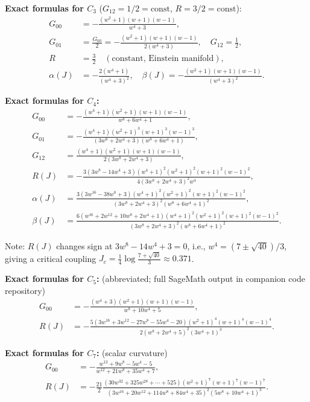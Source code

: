 \documentclass[11pt]{article}
\theoremstyle{definition}
\theoremstyle{remark}
\begin{document}
\textbf{Exact formulas for $C_3$} ($G_{12} = 1/2 = \mathrm{const}$, $R = 3/2 = \mathrm{const}$):
\begin{align}
  G_{00} &= -\frac{(w^2+1)(w+1)(w-1)}{w^4+3}, \\
  G_{01} &= \frac{G_{00}}{2} = -\frac{(w^2+1)(w+1)(w-1)}{2(w^4+3)}, \quad G_{12} = \frac{1}{2}, \\
  R &= \frac{3}{2} \quad (\text{constant, Einstein manifold}), \\
  \alpha(J) &= -\frac{2(w^4+1)}{(w^4+3)^2}, \quad
  \beta(J) = -\frac{(w^2+1)(w+1)(w-1)}{(w^4+3)^2}.
\end{align}

\textbf{Exact formulas for $C_4$:}
\begin{align}
  G_{00} &= -\frac{(w^4+1)(w^2+1)(w+1)(w-1)}{w^8+6w^4+1}, \\
  G_{01} &= -\frac{(w^4+1)(w^2+1)^3(w+1)^3(w-1)^3}{(3w^8+2w^4+3)(w^8+6w^4+1)}, \\
  G_{12} &= \frac{(w^4+1)(w^2+1)(w+1)(w-1)}{2(3w^8+2w^4+3)}, \\
  R(J) &= -\frac{3(3w^8-14w^4+3)(w^4+1)^2(w^2+1)^2(w+1)^2(w-1)^2}{4(3w^8+2w^4+3)^2 w^4}, \\
  \alpha(J) &= \frac{3(3w^{16}-38w^8+3)(w^4+1)^2(w^2+1)^2(w+1)^2(w-1)^2}{(3w^8+2w^4+3)^2(w^8+6w^4+1)^2}, \\
  \beta(J) &= \frac{6(w^{16}+2w^{12}+10w^8+2w^4+1)(w^4+1)^2(w^2+1)^2(w+1)^2(w-1)^2}{(3w^8+2w^4+3)^2(w^8+6w^4+1)^2}.
\end{align}

Note: $R(J)$ changes sign at $3w^8-14w^4+3=0$, i.e., $w^4=(7\pm\sqrt{40})/3$,
giving a critical coupling $J_c = \frac{1}{4}\log\frac{7+\sqrt{40}}{3} \approx 0.371$.

\textbf{Exact formulas for $C_5$:} (abbreviated; full SageMath output in companion code repository)
\begin{align}
  G_{00} &= -\frac{(w^4+3)(w^2+1)(w+1)(w-1)}{w^8+10w^4+5}, \\
  R(J) &= -\frac{5(3w^{16}+3w^{12}-27w^8-55w^4-20)(w^2+1)^4(w+1)^4(w-1)^4}{2(w^8+2w^4+5)^2(3w^4+1)^3}.
\end{align}

\textbf{Exact formulas for $C_7$:} (scalar curvature)
\begin{align}
  G_{00} &= -\frac{w^{12} + 9w^8 - 5w^4 - 5}{w^{12} + 21w^8 + 35w^4 + 7}, \\
  R(J) &= -\frac{21}{2}\frac{(30w^{32}+325w^{28}+\cdots+525)(w^2+1)^7(w+1)^7(w-1)^7}{(3w^{16}+20w^{12}+114w^8+84w^4+35)^2(5w^8+10w^4+1)^3}.
\end{align}
\end{document}
